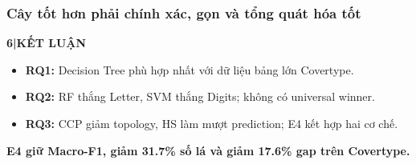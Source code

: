 \documentclass[aspectratio=169,12pt]{beamer}
\newif\ifappendixslides
\newcommand{\chaptertag}[2]{%
  \vspace{-0.16cm}%
  {\scriptsize\bfseries\textcolor{boxframe}{#1\enspace |\enspace #2}}\par
  \vspace{0.12cm}%
}
\begin{document}
\begin{frame}
  \frametitle{Cây tốt hơn phải chính xác, gọn và tổng quát hóa tốt}
  \chaptertag{6}{KẾT LUẬN}
  \begin{itemize}
    \item \textbf{RQ1:} Decision Tree phù hợp nhất với dữ liệu bảng lớn Covertype.
    \item \textbf{RQ2:} RF thắng Letter, SVM thắng Digits; không có universal winner.
    \item \textbf{RQ3:} CCP giảm topology, HS làm mượt prediction; E4 kết hợp hai cơ chế.
  \end{itemize}
  \vspace{0.35cm}
  \begin{tcolorbox}[focusbox,width=0.92\textwidth,top=3mm,bottom=3mm]
    \centering\large\bfseries
    E4 giữ Macro-F1, giảm 31.7\% số lá và giảm 17.6\% gap trên Covertype.
  \end{tcolorbox}
\end{frame}

\appendix
\appendixslidestrue
\setcounter{framenumber}{0}
\end{document}
